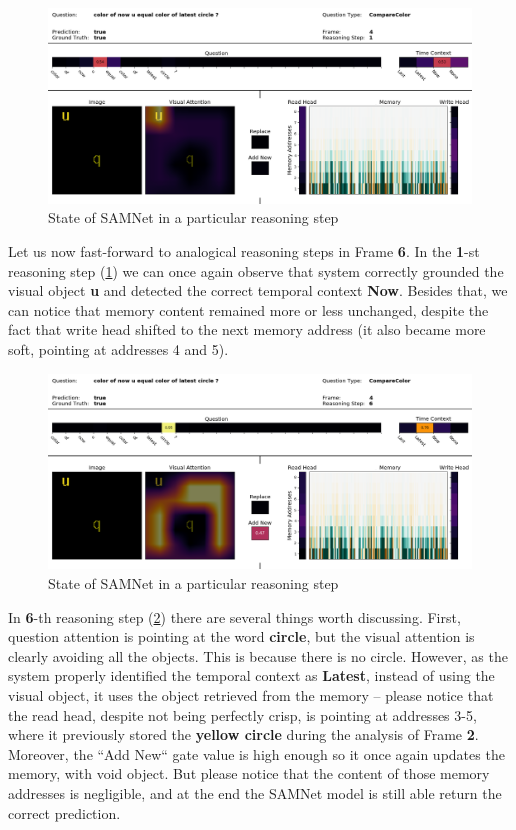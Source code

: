 \begin{figure}[!h]
	\centering
	\includegraphics[width=\textwidth]{"../img/visualization/sample 2/Frame 4 Step 1"}
	\caption{State of SAMNet in a particular reasoning step} 
	\label{fig:frame-4-step-1}
\end{figure}

Let us now fast-forward to analogical reasoning steps in Frame \textbf{6}.
In the \textbf{1}-st reasoning step (\cref{fig:frame-4-step-1}) we can once again observe that  system correctly grounded the visual object \textbf{u} and detected the correct temporal context \textbf{Now}.
Besides that, we can notice that memory content remained more or less unchanged, despite the fact that write head shifted to the next memory address (it also became more soft, pointing at addresses 4 and 5).

\begin{figure}[!h]
	\centering
	\includegraphics[width=\textwidth]{"../img/visualization/sample 2/Frame 4 Step 6"}
	\caption{State of SAMNet in a particular reasoning step} 
	\label{fig:frame-4-step-6}
\end{figure}

In \textbf{6}-th reasoning step (\cref{fig:frame-4-step-6}) there are several things worth discussing.
First, question attention is pointing at the word \textbf{circle}, but the visual attention is clearly avoiding all the objects. 
This is because there is no circle.
However, as the system properly identified the temporal context as \textbf{Latest}, instead of using the visual object, it uses the object retrieved from the memory -- please notice that the read head, despite not being perfectly crisp, is pointing at addresses 3-5, where it previously stored the \textbf{yellow circle} during the analysis of Frame \textbf{2}.
Moreover, the ``Add New`` gate value is high enough so it once again updates the memory, with void object. 
But please notice that the content of those memory addresses is negligible, and at the end the SAMNet model is still able return the correct prediction.
